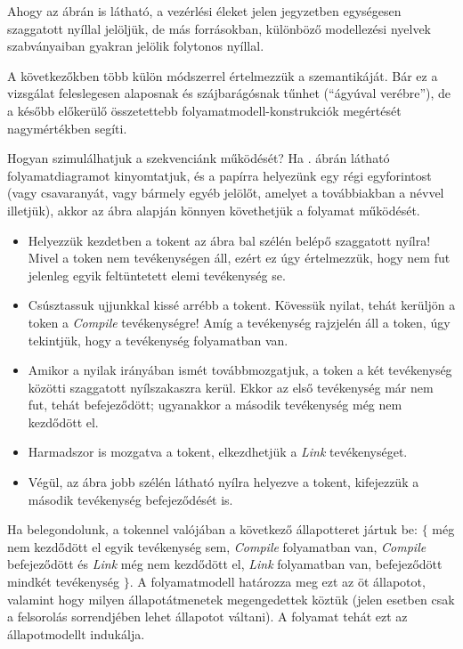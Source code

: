 \begin{megjegyzes}
Ahogy az ábrán is látható, a vezérlési éleket jelen jegyzetben egységesen szaggatott nyíllal jelöljük, de más forrásokban, különböző modellezési nyelvek szabványaiban gyakran jelölik folytonos nyíllal. 
\end{megjegyzes}


A következőkben több külön módszerrel értelmezzük a  szemantikáját. Bár ez a vizsgálat feleslegesen alaposnak és szájbarágósnak tűnhet (``ágyúval verébre''), de a később előkerülő összetettebb folyamatmodell-konstrukciók megértését nagymértékben segíti.

\begin{pelda}
Hogyan szimulálhatjuk a szekvenciánk működését? Ha . ábrán látható folyamatdiagramot kinyomtatjuk, és a papírra helyezünk egy régi egyforintost (vagy csavaranyát, vagy bármely egyéb jelölőt, amelyet a továbbiakban a  névvel illetjük), akkor az ábra alapján könnyen követhetjük a folyamat működését. \begin{itemize}
  \item Helyezzük kezdetben a tokent az ábra bal szélén belépő szaggatott nyílra! Mivel a token nem tevékenységen áll, ezért ez úgy értelmezzük, hogy nem fut jelenleg egyik feltüntetett elemi tevékenység se.
  \item Csúsztassuk ujjunkkal kissé arrébb a tokent. Kövessük nyilat, tehát kerüljön a token a \emph{Compile} tevékenységre! Amíg a tevékenység rajzjelén áll a token, úgy tekintjük, hogy a tevékenység folyamatban van.
  \item Amikor a nyilak irányában ismét továbbmozgatjuk, a token a két tevékenység közötti szaggatott nyílszakaszra kerül. Ekkor az első tevékenység már nem fut, tehát befejeződött; ugyanakkor a második tevékenység még nem kezdődött el.
  \item Harmadszor is mozgatva a tokent, elkezdhetjük a \emph{Link} tevékenységet.
  \item Végül, az ábra jobb szélén látható nyílra helyezve a tokent, kifejezzük a második tevékenység befejeződését is.
\end{itemize}
Ha belegondolunk, a tokennel valójában  a következő állapotteret jártuk be: $\{$ még nem kezdődött el egyik tevékenység sem, \emph{Compile} folyamatban van, \emph{Compile} befejeződött és \emph{Link} még nem kezdődött el, \emph{Link} folyamatban van, befejeződött mindkét tevékenység $\}$. A folyamatmodell határozza meg ezt az öt állapotot, valamint hogy milyen állapotátmenetek megengedettek köztük (jelen esetben csak a felsorolás sorrendjében lehet állapotot váltani). A folyamat tehát ezt az állapotmodellt indukálja.
\end{pelda}


